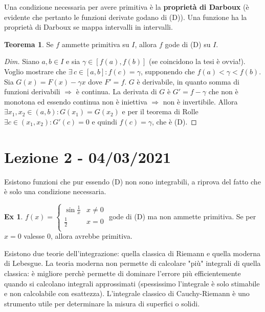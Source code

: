 \documentclass{article}
\theoremstyle{definition}
\newtheorem{theorem}{Teorema}[section]
\theoremstyle{definition}
\theoremstyle{definition}
\theoremstyle{definition}
\theoremstyle{definition}
\newtheorem{example}{Ex}[section]
\begin{document}
Una condizione necessaria per avere primitiva è la \textbf{proprietà di Darboux} (è evidente che pertanto le funzioni derivate godano di (D)). Una funzione ha la proprietà di Darboux se mappa intervalli in intervalli.

\begin{theorem}
    Se $f$ ammette primitiva su $I$, allora $f$ gode di (D) su $I$.
    \begin{proof}[Dim]
        Siano $a,b \in I$ e sia $\gamma \in [f(a),f(b)]$ (se coincidono la tesi è ovvia!). Voglio mostrare che $\exists \, c \in [a,b]: f(c)=\gamma$, supponendo che $f(a)<\gamma < f(b)$. Sia $G(x)=F(x)-\gamma x$ dove $F'=f$. $G$ è derivabile, in quanto somma di funzioni derivabili $\Rightarrow$ è continua. La derivata di $G$ è $G'=f-\gamma$ che non è monotona ed essendo continua non è iniettiva $\Rightarrow$ non è invertibile. Allora $\exists x_1,x_2 \in (a,b): G(x_1) = G(x_2)$ e per il teorema di Rolle $\exists c \in (x_1,x_2): G'(c)=0$ e quindi $f(c) = \gamma$, che è (D).
    \end{proof}
\end{theorem}

\newpage
\section{Lezione 2 - 04/03/2021}

Esistono funzioni che pur essendo (D) non sono integrabili, a riprova del fatto che è solo una condizione necessaria.
\begin{example}
    $f(x) = \begin{cases}
        \sin \frac{1}{x} & \text{$x \neq 0$} \\
        \frac{1}{2} & \text{$x=0$} \\
    \end{cases}$
    gode di (D) ma non ammette primitiva. Se per $x=0$ valesse 0, allora avrebbe primitiva.
\end{example}

Esistono due teorie dell'integrazione: quella classica di Riemann e quella moderna di Lebesgue. La teoria moderna non permette di calcolare "più" integrali di quella classica: è migliore perchè permette di dominare l'errore più efficientemente quando si calcolano integrali approssimati (spessissimo l'integrale è solo stimabile e non calcolabile con esattezza). L'integrale classico di Cauchy-Riemann è uno strumento utile per determinare la misura di superfici o solidi.

\vspace{3mm}
\end{document}
